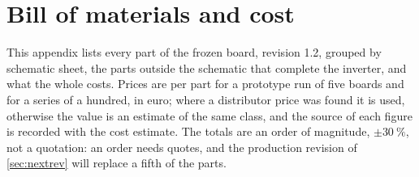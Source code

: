 \chapter{Bill of materials and cost}
\label{app:bom}

This appendix lists every part of the frozen board, revision 1.2, grouped by
schematic sheet, the parts outside the schematic that complete the inverter,
and what the whole costs. Prices are per part for a prototype run of five
boards and for a series of a hundred, in euro; where a distributor price was
found it is used, otherwise the value is an estimate of the same class, and the
source of each figure is recorded with the cost estimate.
The totals are an order of magnitude, $\pm\SI{30}{\percent}$, not a quotation:
an order needs quotes, and the production revision of \cref{sec:nextrev} will
replace a fifth of the parts.

